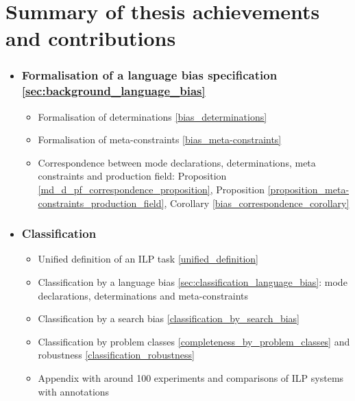 \section{Summary of thesis achievements and contributions}
\begin{itemize}
\item \subsubsection{Formalisation of a language bias specification \ref{sec:background_language_bias}}
\begin{itemize}

\item Formalisation of determinations \ref{bias_determinations}
\item Formalisation of meta-constraints \ref{bias_meta-constraints}
\item Correspondence between mode declarations, determinations, meta constraints  and production field: Proposition \ref{md_d_pf_correspondence_proposition}, Proposition \ref{proposition_meta-constraints_production_field}, Corollary \ref{bias_correspondence_corollary}
\end{itemize}
\item \subsubsection{Classification}
\begin{itemize}
\item Unified definition of an ILP task \ref{unified_definition}
\item Classification by a language bias \ref{sec:classification_language_bias}: mode declarations, determinations and meta-constraints
\item Classification by a search bias \ref{classification_by_search_bias}
\item Classification by problem classes \ref{completeness_by_problem_classes} and robustness \ref{classification_robustness}
\item Appendix with around 100 experiments and comparisons of ILP systems with annotations
\end{itemize}


\end{itemize}
